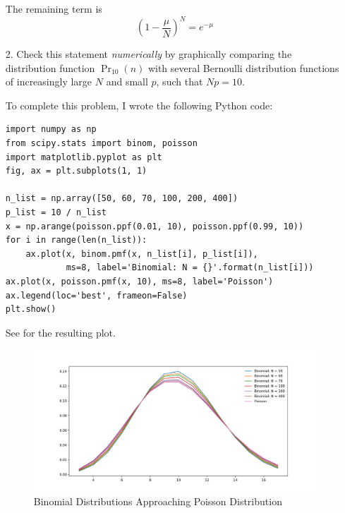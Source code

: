 \documentclass[a4paper,twoside]{article}
\begin{document}
\begin{itemize}
\begin{problem}
\begin{equation}
            \end{equation}
            The remaining term is
            \begin{equation}
                \left( 1 - \frac{\mu}{N} \right)^{N} = e^{- \mu}
            \end{equation}
        \end{problem}
    \item[2.] Check this statement \textit{numerically} by graphically comparing the distribution function $ \Pr_{10}(n) $ with several Bernoulli distribution functions of increasingly large $ N $ and small $ p $, such that $ Np = 10 $.
        \begin{problem}
            To complete this problem, I wrote the following Python code:
            \begin{verbatim}
import numpy as np
from scipy.stats import binom, poisson
import matplotlib.pyplot as plt
fig, ax = plt.subplots(1, 1)

n_list = np.array([50, 60, 70, 100, 200, 400])
p_list = 10 / n_list
x = np.arange(poisson.ppf(0.01, 10), poisson.ppf(0.99, 10))
for i in range(len(n_list)):
    ax.plot(x, binom.pmf(x, n_list[i], p_list[i]),
            ms=8, label='Binomial: N = {}'.format(n_list[i]))
ax.plot(x, poisson.pmf(x, 10), ms=8, label='Poisson')
ax.legend(loc='best', frameon=False)
plt.show()
            \end{verbatim}
        See  for the resulting plot.
        \end{problem}
        \begin{figure}[h]
            \centering
            \includegraphics[width=\textwidth]{homework_02_fig.png}
            \caption{Binomial Distributions Approaching Poisson Distribution}
            \label{fig:binom_vs_poisson}
        \end{figure}


\end{itemize}
\end{document}
